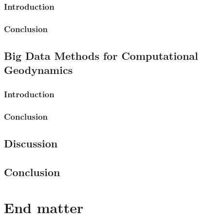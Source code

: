 \documentclass[letterpaper,10pt,english]{jupyterBook}
\begin{document}
\section{Introduction}
\label{\detokenize{content/chapter_06_viscoplastic/introduction:introduction}}\label{\detokenize{content/chapter_06_viscoplastic/introduction::doc}}

\section{Conclusion}
\label{\detokenize{content/chapter_06_viscoplastic/conclusion:conclusion}}\label{\detokenize{content/chapter_06_viscoplastic/conclusion::doc}}

\chapter{Big Data Methods for Computational Geodynamics}
\label{\detokenize{content/chapter_07_advanced/abstract:big-data-methods-for-computational-geodynamics}}\label{\detokenize{content/chapter_07_advanced/abstract::doc}}

\section{Introduction}
\label{\detokenize{content/chapter_07_advanced/introduction:introduction}}\label{\detokenize{content/chapter_07_advanced/introduction::doc}}

\section{Conclusion}
\label{\detokenize{content/chapter_07_advanced/conclusion:conclusion}}\label{\detokenize{content/chapter_07_advanced/conclusion::doc}}

\chapter{Discussion}
\label{\detokenize{content/chapter_08_discussion/main:discussion}}\label{\detokenize{content/chapter_08_discussion/main::doc}}

\chapter{Conclusion}
\label{\detokenize{content/chapter_09_conclusion/main:conclusion}}\label{\detokenize{content/chapter_09_conclusion/main::doc}}

\part{End matter}
\end{document}
